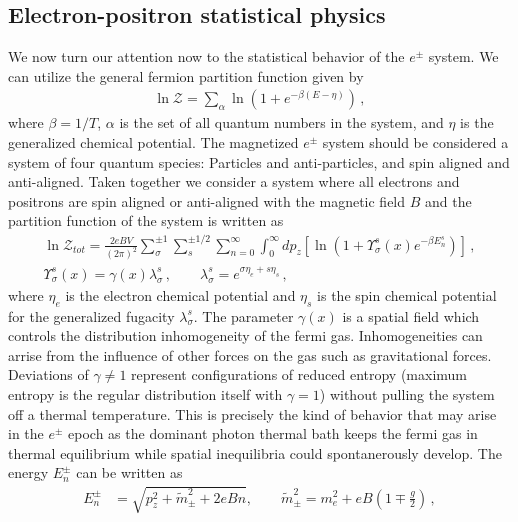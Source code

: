 \documentclass[Universe,article,submit,moreauthors,pdftex]{Definitions/mdpi}
\begin{document}
\subsection{Electron-positron statistical physics}\label{subsec:Partition}
\noindent We now turn our attention now to the statistical behavior of the $e^{\pm}$ system. We can utilize the general fermion partition function given by
\begin{align}
  \label{PartFunc} \ln\mathcal{Z}=\sum_{\alpha}\ln\left(1+e^{-\beta(E-\eta)}\right)\,,
\end{align}
where $\beta=1/T$, $\alpha$ is the set of all quantum numbers in the system, and $\eta$ is the generalized chemical potential. The magnetized $e^{\pm}$ system should be considered a system of four quantum species: Particles and anti-particles, and spin aligned and anti-aligned. Taken together we consider a system where all electrons and positrons are spin aligned or anti-aligned with the magnetic field $B$ and the partition function of the system is written as
\begin{align}
  \label{PartFuncB}\ln\mathcal{Z}_{tot}=\frac{2eBV}{(2\pi)^2}\sum_{\sigma}^{\pm1}\sum_{s}^{\pm1/2}\sum_{n=0}^\infty\int^\infty_{0}dp_z\left[\ln\left(1+\Upsilon_{\sigma}^{s}(x)e^{-\beta E_{n}^{s}}\right)\right]\,,\\
  \label{Fugacity}\Upsilon_{\sigma}^{s}(x)=\gamma(x)\lambda_{\sigma}^{s}\,,\qquad\lambda_{\sigma}^{s}=e^{\sigma\eta_{e}+s\eta_{s}}\,,
\end{align}
where $\eta_{e}$ is the electron chemical potential and $\eta_s$ is the spin chemical potential for the generalized fugacity $\lambda_{\sigma}^{s}$. The parameter $\gamma(x)$ is a spatial field which controls the distribution inhomogeneity of the fermi gas. Inhomogeneities can arrise from the influence of other forces on the gas such as gravitational forces. Deviations of $\gamma\neq1$ represent configurations of reduced entropy (maximum entropy is the regular distribution itself with $\gamma=1$) without pulling the system off a thermal temperature. This is precisely the kind of behavior that may arise in the $e^{\pm}$ epoch as the dominant photon thermal bath keeps the fermi gas in thermal equilibrium while spatial inequilibria could spontanerously develop. The energy $E_{n}^\pm$ can be written as
\begin{align}
E_{n}^\pm&=\sqrt{p^2_z+\tilde m^2_\pm+2eBn},\qquad\tilde{m}^2_\pm=m^2_e+eB\left(1\mp\frac{g}{2}\right)\,,
\end{align}
\end{document}
